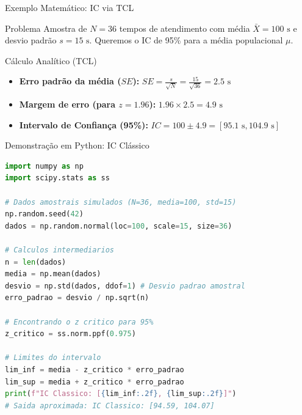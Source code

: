 \begin{frame}{Exemplo Matemático: IC via TCL}
    \begin{block}{Problema}
        Amostra de $N=36$ tempos de atendimento com média $\bar{X}=100\text{ s}$ e desvio padrão $s=15\text{ s}$. Queremos o IC de 95\% para a média populacional $\mu$.
    \end{block}
    \begin{block}{Cálculo Analítico (TCL)}
        \begin{itemize}
            \item \textbf{Erro padrão da média ($SE$):} $SE = \frac{s}{\sqrt{N}} = \frac{15}{\sqrt{36}} = 2.5\text{ s}$
            \item \textbf{Margem de erro (para $z = 1.96$):} $1.96 \times 2.5 = 4.9\text{ s}$
            \item \textbf{Intervalo de Confiança (95\%):} $IC = 100 \pm 4.9 = [95.1\text{ s}, 104.9\text{ s}]$
        \end{itemize}
    \end{block}
\end{frame}

\begin{frame}[fragile]{Demonstração em Python: IC Clássico}
    \begin{lstlisting}[language=Python]
import numpy as np
import scipy.stats as ss

# Dados amostrais simulados (N=36, media=100, std=15)
np.random.seed(42)
dados = np.random.normal(loc=100, scale=15, size=36)

# Calculos intermediarios
n = len(dados)
media = np.mean(dados)
desvio = np.std(dados, ddof=1) # Desvio padrao amostral
erro_padrao = desvio / np.sqrt(n)

# Encontrando o z critico para 95%
z_critico = ss.norm.ppf(0.975)

# Limites do intervalo
lim_inf = media - z_critico * erro_padrao
lim_sup = media + z_critico * erro_padrao
print(f"IC Classico: [{lim_inf:.2f}, {lim_sup:.2f}]")
# Saida aproximada: IC Classico: [94.59, 104.07]
    \end{lstlisting}
\end{frame}

